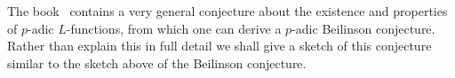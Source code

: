 \documentclass{amsart}
\begin{document}
The book~\cite{Peri96} contains a very general
conjecture about the existence and properties of {$p$-adic{\futurelet{}}}
{$L$-functions{\futurelet{}}}, from which one can derive a {$p$-adic{\futurelet{}}} Beilinson conjecture.
Rather than explain this in full detail we shall give a 
sketch of this conjecture similar to the sketch above of the
Beilinson conjecture.
\end{document}
